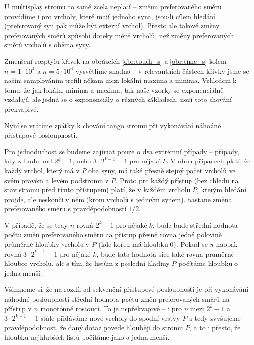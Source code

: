 U multisplay stromu to samé zcela neplatí -- změnu preferovaného směru
provádíme i pro vrcholy, které mají jednoho syna, jsou-li cílem hledání
(preferovaný syn pak může být externí vrchol). Přesto ale takové změny
preferovaných směrů způsobí doteky méně vrcholů, než změny preferovaných směrů vrcholů s oběma syny.

Zmenšení rozptylu křivek na obrázcích \ref{obr:touch_s} a \ref{obr:time_s}
kolem $n=1\cdot 10^4$ a $n=5\cdot 10^6$ vysvětlíme snadno -- v relevantních
částech křivky jsme se naším samplováním trefili někam mezi lokální maxima a
minima. Vzhledem k tomu, že jak lokální minima a maxima, tak naše vzorky se
exponenciálně vzdalují, ale jedná se o exponenciály o různých základech, není
toto chování překvapivé.

Nyní se vrátíme zpátky k chování tango stromu při vykonávání náhodné přístupové
posloupnosti.

Pro jednoduchost se budeme zajímat pouze o dva extrémní případy --
případy, kdy $n$ bude buď $2^k-1$, nebo $3\cdot 2^{k-1} - 1$ pro nějaké $k$. V obou
případech platí, že každý vrchol, který má v $P$ oba syny, má také přesně
stejný počet vrcholů ve svém pravém a levém podstromu v $P$. Proto pro každý
přístup (bez ohledu na stav stromu před tímto přístupem) platí, že v každém
vrcholu $P$, kterým hledání projde, ale neskončí v něm (krom vrcholů s jediným
synem), nastane změna preferovaného směru s pravděpodobností $1/2$.

V případě, že se tedy $n$ rovná $2^k-1$ pro nějaké $k$, bude bude střední
hodnota počtu změn preferovaného směru na přístup přesně rovna jedné polovině
průměrné hloubky vrcholu v $P$ (kde kořen má hloubku 0). Pokud se $n$ naopak rovná
$3\cdot2^{k-1}-1$ pro nějaké $k$, bude tato hodnota sice také rovna průměrné
hloubce vrcholu, ale s tím, že listům z poslední hladiny $P$ počítáme hloubku o jedna menší.

Všimneme si, že na rozdíl od sekvenční přístupové posloupnosti je při vykonávání náhodné
posloupnosti střední hodnota počtů změn preferovaných směrů na přístup v $n$
monotónně rostoucí. To je nepřekvapivé -- i pro $n$ mezi $2^k-1$ a $3\cdot
2^{k-1}-1$ stále přidáváme nové vrcholy do spodní vrstvy $P$ a tedy zvyšujeme
pravděpodobnost, že daný dotaz povede hlouběji do stromu $P$, a to i přesto, že
hloubku nejhlubších listů počítáme jako o jedna menší.


